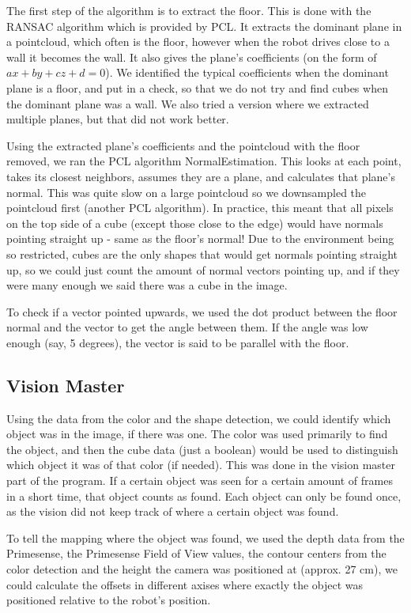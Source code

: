 \documentclass[10pt,a4paper,twocolumn]{article}
\begin{document}
The first step of the algorithm is to extract the floor. This is done with the
RANSAC algorithm which is provided by PCL. It extracts the dominant plane in a
pointcloud, which often is the floor, however when the robot drives close to a
wall it becomes the wall. It also gives the plane’s coefficients (on the form of
$ax+by+cz+d=0$). We identified the typical coefficients when the dominant plane
is a floor, and put in a check, so that we do not try and find cubes when the
dominant plane was a wall. We also tried a version where we extracted multiple
planes, but that did not work better.

Using the extracted plane’s coefficients and the pointcloud with the floor
removed, we ran the PCL algorithm NormalEstimation. This looks at each point,
takes its closest neighbors, assumes they are a plane, and calculates that
plane’s normal. This was quite slow on a large pointcloud so we downsampled the
pointcloud first (another PCL algorithm). In practice, this meant that all
pixels on the top side of a cube (except those close to the edge) would have
normals pointing straight up - same as the floor’s normal! Due to the
environment being so restricted, cubes are the only shapes that would get
normals pointing straight up, so we could just count the amount of normal
vectors pointing up, and if they were many enough we said there was a cube in
the image.

To check if a vector pointed upwards, we used the dot product between the floor
normal and the vector to get the angle between them. If the angle was low enough
(say, 5 degrees), the vector is said to be parallel with the floor.
\subsection{Vision Master}
Using the data from the color and the shape detection, we could identify which
object was in the image, if there was one. The color was used primarily to find
the object, and then the cube data (just a boolean) would be used to distinguish
which object it was of that color (if needed). This was done in the vision
master part of the program. If a certain object was seen for a certain amount of
frames in a short time, that object counts as found. Each object can only be
found once, as the vision did not keep track of where a certain object was
found.

To tell the mapping where the object was found, we used the depth data from the
Primesense, the Primesense Field of View values, the contour centers from the
color detection and the height the camera was positioned at (approx. 27 cm), we
could calculate the offsets in different axises where exactly the object was
positioned relative to the robot’s position.
\end{document}
